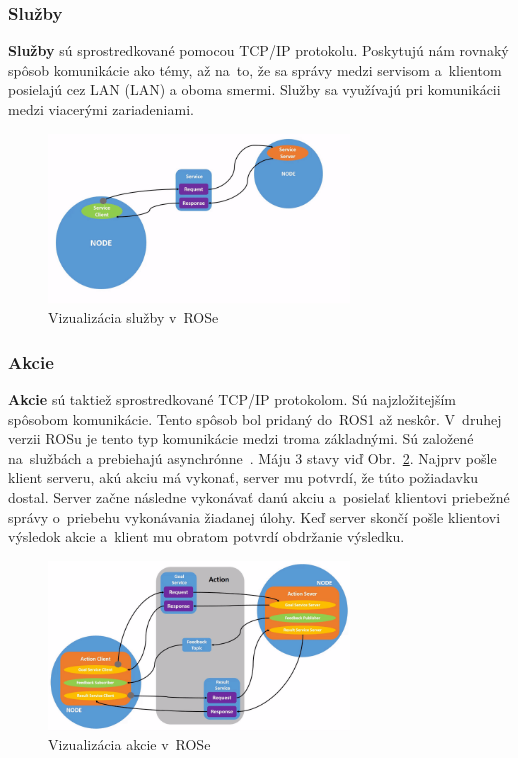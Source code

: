 \newpage
\subsubsection{Služby}

	\textbf {Služby} sú sprostredkované pomocou TCP/IP protokolu. Poskytujú nám rovnaký spôsob komunikácie ako témy, až na~to, že sa správy
	medzi servisom a~klientom posielajú cez LAN (\acrlong{LAN}) a oboma smermi. Služby sa využívajú pri komunikácii medzi viacerými zariadeniami.

	\begin{figure}[h]
		\centering
		\includegraphics[width=8cm]{img/serviceExplanation.png}
		\caption{Vizualizácia služby v~ROSe~\cite{RosDoc}}
		\label{fig:service}
	\end{figure}

\subsubsection{Akcie}

	\label{s_action}
	\textbf {Akcie} sú taktiež sprostredkované TCP/IP protokolom. Sú najzložitejším spôsobom komunikácie. Tento spôsob bol pridaný do~ROS1
	až neskôr. V~druhej verzii ROSu je tento typ komunikácie medzi troma základnými. Sú založené na~službách a prebiehajú asynchrónne~\cite{ROS2book}.
	Máju 3 stavy viď Obr.~\ref{fig:action}. Najprv pošle klient serveru, akú akciu má vykonať, server mu potvrdí, že túto požiadavku dostal. Server
	začne následne vykonávať danú akciu a~posielať klientovi priebežné správy o~priebehu vykonávania žiadanej úlohy. Keď server skončí pošle klientovi
	výsledok akcie a~klient mu obratom potvrdí obdržanie výsledku.

	\begin{figure}[h]
		\centering
		\includegraphics[width=8cm]{img/actionExplanation.png}
		\caption{Vizualizácia akcie v~ROSe~\cite{RosDoc}}
		\label{fig:action}
	\end{figure}

